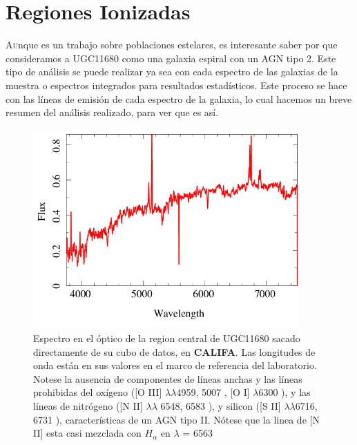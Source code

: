 \chapter{Regiones Ionizadas}



\lettrine[lines=1]{A}unque es un trabajo sobre poblaciones estelares, es interesante saber por que consideramos a UGC11680 como una galaxia espiral con un AGN  tipo 2. Este tipo de análisis se puede realizar ya sea con cada espectro de las galaxias de la muestra o espectros integrados para resultados estadísticos. Este proceso se  hace con las líneas de emisión de cada espectro de la galaxia, lo cual hacemos un breve resumen del análisis realizado, para ver que es así.


\begin{figure}[!ht]
  \centering
  \includegraphics[width=4in]{spec_cen_UGC11680NED01.png}
  \caption[Espectro central UGC11680]
   {Espectro en el óptico de la region central de UGC11680 sacado directamente de su cubo de datos, en \textbf{CALIFA}. Las longitudes de onda están en sus valores en el marco de referencia del laboratorio. Notese la ausencia de componentes de líneas anchas y las líneas prohibidas del oxígeno ([O III] $\lambda \lambda$4959, 5007 \text{\AA}, [O I] $\lambda$6300 \text{\AA}), y las líneas de  nitrógeno ([N II]  $\lambda \lambda$ 6548, 6583 \text{\AA}), y silicon ([S II] $\lambda \lambda$6716, 6731 \text{\AA}), características de un AGN tipo II.  Nótese que la linea de  [N II] esta casi mezclada con  $H_{\alpha}$ en $\lambda$ = 6563 \text{\AA} }
\label{espectro}
\end{figure}



